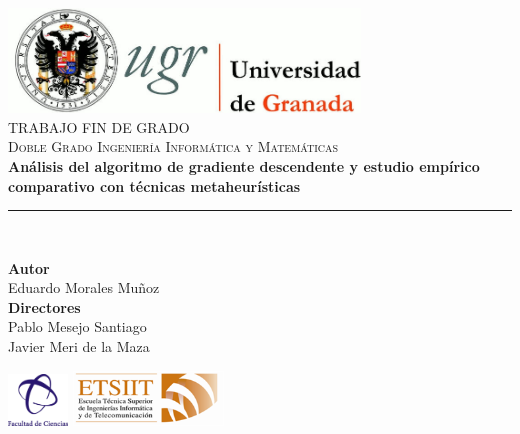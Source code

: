 \begin{titlepage}
 
 
\newlength{\centeroffset}
\setlength{\centeroffset}{-0.5\oddsidemargin}
\addtolength{\centeroffset}{0.5\evensidemargin}
\thispagestyle{empty}

\noindent\hspace*{\centeroffset}\begin{minipage}{\textwidth}

\centering
\includegraphics[width=0.7\textwidth]{Plantilla_TFG_latex/imagenes/logo_ugr.jpg}\\[1.4cm]

\textsc{ \Large TRABAJO FIN DE GRADO\\[0.2cm]}
\textsc{ Doble Grado Ingeniería Informática y Matemáticas}\\[1cm]
% 
{\huge\bfseries Análisis del algoritmo de gradiente descendente y estudio empírico comparativo con técnicas metaheurísticas\\
}
\noindent\rule[-1ex]{\textwidth}{3pt}\\[3.5ex]

\end{minipage}

\vspace{1cm}
\noindent\hspace*{\centeroffset}\begin{minipage}{\textwidth}
\centering

\textbf{Autor}\\ {Eduardo Morales Muñoz}\\[2.5ex]
\textbf{Directores}\\
{Pablo Mesejo Santiago\\
Javier Meri de la Maza}\\[1cm]
\raggedright
\hspace{3cm}
\includegraphics[width=0.12\textwidth]{Plantilla_TFG_latex/imagenes/fcienciasLogo.png}\hspace{3.5cm}
\includegraphics[width=0.3\textwidth]{Plantilla_TFG_latex/imagenes/etsiit_logo.png} \\[0.1cm]


\end{minipage}
\end{titlepage}
